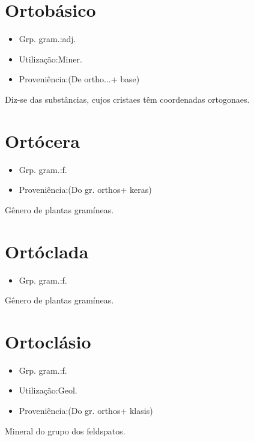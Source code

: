 \section{Ortobásico}
\begin{itemize}
\item {Grp. gram.:adj.}
\end{itemize}
\begin{itemize}
\item {Utilização:Miner.}
\end{itemize}
\begin{itemize}
\item {Proveniência:(De \textunderscore ortho...\textunderscore  + \textunderscore base\textunderscore )}
\end{itemize}
Diz-se das substâncias, cujos cristaes têm coordenadas ortogonaes.
\section{Ortócera}
\begin{itemize}
\item {Grp. gram.:f.}
\end{itemize}
\begin{itemize}
\item {Proveniência:(Do gr. \textunderscore orthos\textunderscore  + \textunderscore keras\textunderscore )}
\end{itemize}
Gênero de plantas gramíneas.
\section{Ortóclada}
\begin{itemize}
\item {Grp. gram.:f.}
\end{itemize}
Gênero de plantas gramíneas.
\section{Ortoclásio}
\begin{itemize}
\item {Grp. gram.:f.}
\end{itemize}
\begin{itemize}
\item {Utilização:Geol.}
\end{itemize}
\begin{itemize}
\item {Proveniência:(Do gr. \textunderscore orthos\textunderscore  + \textunderscore klasis\textunderscore )}
\end{itemize}
Mineral do grupo dos feldspatos.
